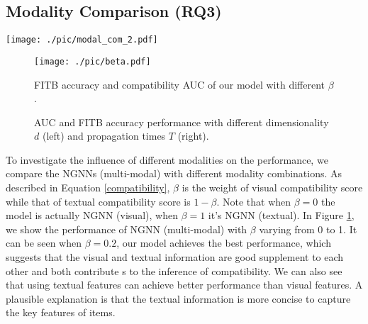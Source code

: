 \documentclass[sigconf]{acmart}
\begin{document}
\subsection{Modality Comparison (RQ3)}

 \begin{figure*}[t]
  \centering
\texttt{[image: ./pic/modal\_com\_2.pdf]}
  \caption{Comparison of NGNN(visual), NGNN(textual) and NGNN(multi-modal). For each outfit in the left, there is a true answer (T) and a false answer (F). Green fonts reprsent true chosen while red fonts represent false chosen.}
  \label{fig:modal_compare}
\end{figure*}

\begin{figure}[hbtp]
  \centering
  \vspace{1.0em}
\texttt{[image: ./pic/beta.pdf]}

  \caption{FITB accuracy and compatibility AUC of our model with different $\beta$.}
  \vspace{1.0em}
  \label{fig:beta}
\end{figure}



\begin{figure}[hbtp]
\centering

\caption{AUC and FITB accuracy performance with different dimensionality $d$ (left) and propagation times $T$ (right).}
\label{fig:performance}
\end{figure}

To investigate the influence of different modalities on the performance, we compare the NGNNs (multi-modal) with different modality combinations.
As described in Equation \ref{compatibility}, $\beta$ is the weight of visual compatibility score while that of textual compatibility score is $1-\beta$. Note that when $\beta=0$ the model is actually NGNN (visual), when $\beta=1$ it's NGNN (textual).
In Figure \ref{fig:beta}, we show the performance of NGNN (multi-modal) with $\beta$ varying from 0 to 1.
It can be seen when $\beta=0.2$, our model achieves the best performance, which suggests that the visual and textual information are good supplement to each other and both contribute s to the inference of compatibility. We can also see that using textual features can achieve better performance than visual features. A plausible explanation is that the textual information is more concise to capture the key features of items.
\end{document}
